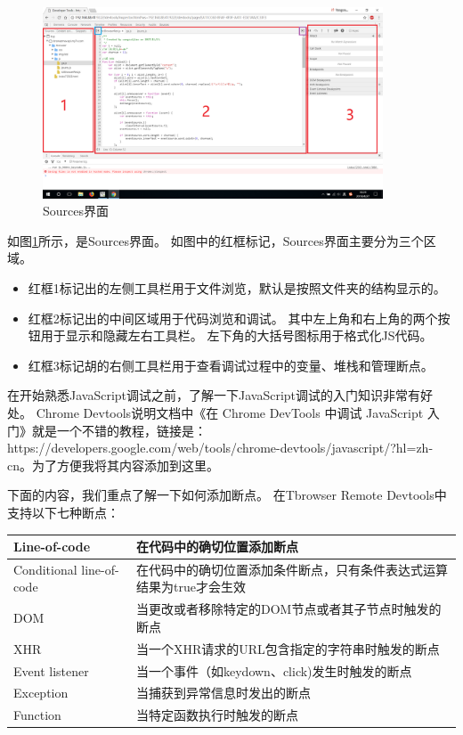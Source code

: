 \begin{figure}[H] 
\centering 
\includegraphics[width=0.9\textwidth]{image/devtools_study/sources_panel.png} 
\caption{Sources界面} \label{fig:sources_panel} 
\end{figure}

如图\ref{fig:sources_panel}所示，是Sources界面。
如图中的红框标记，Sources界面主要分为三个区域。
\begin{itemize}
\item 红框1标记出的左侧工具栏用于文件浏览，默认是按照文件夹的结构显示的。
\item 红框2标记出的中间区域用于代码浏览和调试。
其中左上角和右上角的两个按钮用于显示和隐藏左右工具栏。
左下角的大括号图标用于格式化JS代码。
\item 红框3标记胡的右侧工具栏用于查看调试过程中的变量、堆栈和管理断点。
\end{itemize}

在开始熟悉JavaScript调试之前，了解一下JavaScript调试的入门知识非常有好处。
Chrome Devtools说明文档中《在 Chrome DevTools 中调试 JavaScript 入门》就是一个不错的教程，链接是：https://developers.google.com/web/tools/chrome-devtools/javascript/?hl=zh-cn。为了方便我将其内容添加到这里。

 

下面的内容，我们重点了解一下如何添加断点。
在Tbrowser Remote Devtools中支持以下七种断点：

\begin{tabular}{|l|p{10cm}|}
\hline
Line-of-code & 在代码中的确切位置添加断点\\
\hline
Conditional line-of-code & 在代码中的确切位置添加条件断点，只有条件表达式运算结果为true才会生效\\
\hline
DOM & 当更改或者移除特定的DOM节点或者其子节点时触发的断点 \\
\hline
XHR & 当一个XHR请求的URL包含指定的字符串时触发的断点 \\
\hline
Event listener & 当一个事件（如keydown、click)发生时触发的断点 \\
\hline
Exception & 当捕获到异常信息时发出的断点 \\
\hline
Function & 当特定函数执行时触发的断点 \\
\hline
\end{tabular}

